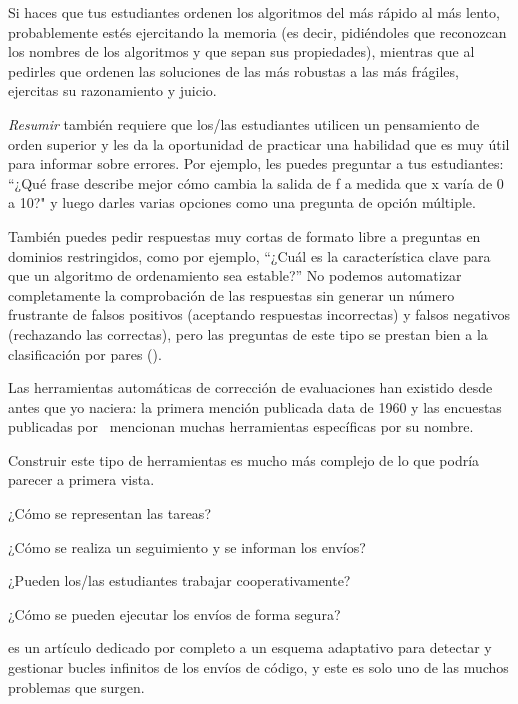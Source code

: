 Si haces que tus estudiantes ordenen los algoritmos del más rápido al más lento, probablemente estés ejercitando la memoria
(es decir, pidiéndoles que reconozcan los nombres de los algoritmos y que sepan sus propiedades), mientras que al pedirles que ordenen las soluciones de las más robustas a las más frágiles, ejercitas su razonamiento y juicio.

\emph{Resumir} también requiere que los/las estudiantes utilicen un pensamiento de orden superior y les da la oportunidad de practicar una habilidad que es muy útil para informar sobre errores.
Por ejemplo, 
les puedes preguntar a tus estudiantes:
 ``¿Qué frase describe mejor cómo cambia la salida de f a medida que  x varía de 0 a 10?" 
y luego darles varias opciones como una pregunta de opción múltiple.

También puedes pedir respuestas muy cortas de formato libre a preguntas en dominios restringidos, como por ejemplo, ``¿Cuál es la característica clave para que un algoritmo de ordenamiento sea estable?”
No podemos automatizar completamente la comprobación de las respuestas sin generar un número frustrante de falsos positivos 
(aceptando respuestas incorrectas) 
y falsos negativos (rechazando las correctas), 
pero las preguntas de este tipo se prestan bien a la clasificación por pares 
().


Las herramientas automáticas de corrección de evaluaciones han existido desde antes que yo naciera: la primera mención publicada data de 1960 y las encuestas publicadas por~\cite{Douc2005,Ihan2010} mencionan muchas herramientas específicas por su nombre.

Construir este tipo de herramientas es mucho más complejo de lo que podría parecer a primera vista.

¿Cómo se representan las tareas?

¿Cómo se realiza un seguimiento y se informan los envíos?

¿Pueden los/las estudiantes trabajar cooperativamente?

¿Cómo se pueden ejecutar los envíos de forma segura?

\cite{Edwa2014a} es un artículo dedicado por completo a un esquema adaptativo para detectar y gestionar bucles infinitos de los envíos de código, y este es solo uno de las muchos problemas que surgen.

